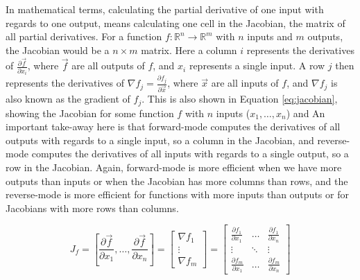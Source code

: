         In mathematical terms, calculating the partial derivative of one input with regards to one output, means calculating one cell in the Jacobian, the matrix of all partial derivatives.
        For a function $f:\mathbb{R}^n\to\mathbb{R}^m$ with $n$ inputs and $m$ outputs, the Jacobian would be a $n\times m$ matrix.
        Here a column $i$ represents the derivatives of $\frac{\partial\vec{f}}{\partial x_i}$, where $\vec{f}$ are all outputs of $f$, and $x_i$ represents a single input.
        A row $j$ then represents the derivatives of $\nabla f_j=\frac{\partial f_j}{\partial\vec{x}}$, where $\vec{x}$ are all inputs of $f$, and $\nabla f_j$ is also known as the gradient of $f_j$.
        This is also shown in Equation \ref{eq:jacobian}, showing the Jacobian for some function $f$ with $n$ inputs ($x_1,\dots,x_n$) and 
        An important take-away here is that forward-mode computes the derivatives of all outputs with regards to a single input, so a column in the Jacobian, and reverse-mode computes the derivatives of all inputs with regards to a single output, so a row in the Jacobian.
        Again, forward-mode is more efficient when we have more outputs than inputs or when the Jacobian has more columns than rows, and the reverse-mode is more efficient for functions with more inputs than outputs or for Jacobians with more rows than columns.

        \begin{equation} \label{eq:jacobian}
            J_f=\left[\frac{\partial \vec{f}}{\partial x_1},\dots,\frac{\partial \vec{f}}{\partial x_n}\right]=\begin{bmatrix}\nabla f_1\\\vdots\\\nabla f_m\end{bmatrix}=\begin{bmatrix}
                \frac{\partial f_1}{\partial x_1} & \dots & \frac{\partial f_1}{\partial x_n}\\
                \vdots & \ddots & \vdots\\
                \frac{\partial f_m}{\partial x_1} & \dots & \frac{\partial f_m}{\partial x_n}
            \end{bmatrix}
        \end{equation}

